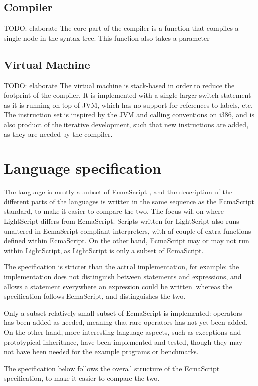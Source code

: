 \documentclass[11pt]{report}
\begin{document}
\subsection{Compiler}
TODO: elaborate 
The core part of the compiler is a function that compiles a single node in the syntax tree. This function also takes a parameter 

\subsection{Virtual Machine}
TODO: elaborate 
The virtual machine is stack-based in order to reduce the footprint of the compiler.
It is implemented with a single larger switch statement as it is running on top of JVM, which has no support for references to labels, etc.
The instruction set is inspired by the JVM and calling conventions on i386, and is also product of the iterative development, such that new instructions are added, as they are needed by the compiler.


\section{Language specification}
The language is mostly a subset of EcmaScript \cite{ecma-262}, and the description of the different parts of the languages is written in the same sequence as the EcmaScript standard, to make it easier to compare the two. The focus will on where LightScript differs from EcmaScript.
Scripts written for LightScript also runs unaltered in EcmaScript compliant interpreters, with af couple of extra functions defined within EcmaScript. On the other hand, EcmaScript may or may not run within LightScript, as LightScript is only a subset of EcmaScript.

The specification is stricter than the actual implementation, for example: the implementation does not distinguish between statements and expressions, and allows a statement everywhere an expression could be written, whereas the specification follows EcmaScript, and distinguishes the two.

Only a subset relatively small subset of EcmaScript is implemented: operators has been added as needed, meaning that rare operators has not yet been added. 
On the other hand, more interesting language aspects, such as exceptions and prototypical inheritance, have been implemented and tested, though they may not have been needed for the example programs or benchmarks.

The specification below follows the overall structure of the EcmaScript specification, to make it easier to compare the two.
\end{document}
